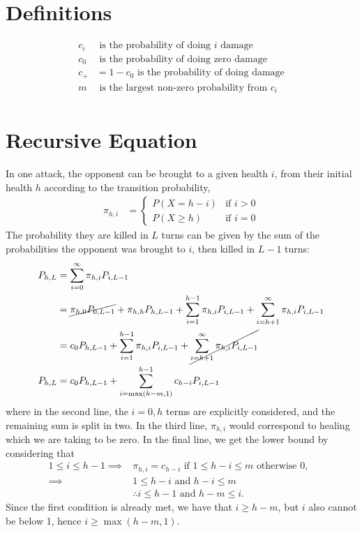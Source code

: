 \section{Definitions}
\begin{align}
c_i & \text{ is the probability of doing $i$ damage} \\
c_0 & \text{ is the probability of doing zero damage} \\
c_+ &= 1 - c_0 \text{ is the probability of doing damage} \\
m & \text{ is the largest non-zero probability from $c_i$} \\
\end{align}

\section{Recursive Equation}
In one attack, the opponent can be brought to a given health $i$, from their initial health $h$ according to the transition probability, 
\begin{align}
	\pi_{h, i} &= \begin{cases}
		P(X=h - i) & \text{if } i > 0 \\
		P(X \ge h) & \text{if } i = 0
    \end{cases}
\end{align}
The probability they are killed in $L$ turns can be given by the sum of the probabilities the opponent was brought to $i$, then killed in $L - 1$ turns:
\begin{align}
	P_{h, L} &= \sum_{i=0}^\infty \pi_{h, i} P_{i, L-1}\\
	&= \cancel{\pi_{h, 0} P_{0, L-1}} + \pi_{h, h} P_{h, L-1} + \sum_{i=1}^{h-1} \pi_{h, i} P_{i, L-1} + \sum_{i=h+1}^\infty \pi_{h, i} P_{i, L-1}\\
	&= c_0P_{h, L-1} + \sum_{i=1}^{h-1} \pi_{h, i} P_{i, L-1} + \cancel{\sum_{i=h+1}^\infty \pi_{h, i} P_{i, L-1}}\\
	P_{h, L} &= c_0P_{h, L-1} + \sum_{i=\max(h-m, 1)}^{h-1} c_{h-i} P_{i, L-1}\\
\end{align}
where in the second line, the $i=0, h$ terms are explicitly considered, and the remaining sum is split in two. In the third line, $\pi_{h, i}$ would correspond to healing which we are taking to be zero. In the final line, we get the lower bound by considering that 
\begin{align}
	1\leq i \leq h-1 \implies& \pi_{h, i} = c_{h-i} \text{ if } 1\leq h - i \leq m \text{ otherwise } 0,\,\,\, \\
	\implies& 1\leq h - i \text{ and } h - i \leq m\\
	&\therefore  i\leq h - 1 \text{ and } h - m \leq i.
\end{align}
Since the first condition is already met, we have that $i \geq h - m$, but $i$ also cannot be below 1, hence $i\geq \max(h - m, 1)$. 




